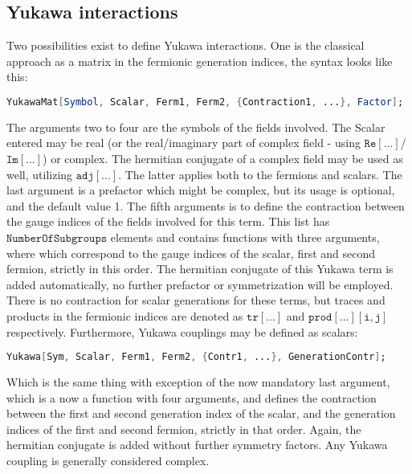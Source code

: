 \documentclass{scrartcl}
\begin{document}
\subsection{Yukawa interactions}
Two possibilities exist to define Yukawa interactions. One is the classical approach as a matrix in the fermionic generation indices, the syntax looks like this:
\begin{lstlisting}[language=mathematica,mathescape,columns=flexible,backgroundcolor=\color{light-gray}]
YukawaMat[Symbol, Scalar, Ferm1, Ferm2, {Contraction1, ...}, Factor];
\end{lstlisting}
The arguments two to four are the symbols of the fields involved. The Scalar entered may be real (or the real/imaginary part of complex field - using $\mathtt{Re[...]}$/$\mathtt{Im[...]}$) or complex. The hermitian conjugate of a complex field may be used as well, utilizing $\mathtt{adj[...]}$. The latter applies both to the fermions and scalars. The last argument is a prefactor which might be complex, but its usage is optional, and the default value 1. The fifth arguments is to define the contraction between the gauge indices of the fields involved for this term. This list has $\mathtt{NumberOfSubgroups}$ elements and contains functions with three arguments, where which correspond to the gauge indices of the scalar, first and second fermion, strictly in this order. The hermitian conjugate of this Yukawa term is added automatically, no further prefactor or symmetrization will be employed. There is no contraction for scalar generations for these terms, but traces and products in the fermionic indices are denoted as $\mathtt{tr[...]}$ and $\mathtt{prod[...][i,j]}$ respectively.\newline 
Furthermore, Yukawa couplings may be defined as scalars:
\begin{lstlisting}[language=mathematica,mathescape,columns=flexible,backgroundcolor=\color{light-gray}]
Yukawa[Sym, Scalar, Ferm1, Ferm2, {Contr1, ...}, GenerationContr];
\end{lstlisting}
Which is the same thing with exception of the now mandatory last argument, which is a now a function with four arguments, and defines the contraction between the first and second generation index of the scalar, and the generation indices of the first and second fermion, strictly in that order. Again, the hermitian conjugate is added without further symmetry factors. Any Yukawa coupling is generally considered complex.
\FloatBarrier
\end{document}
